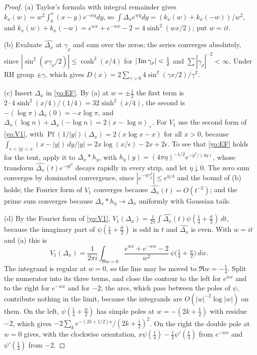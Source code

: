 \begin{proof}
(a) Taylor's formula with integral remainder gives $k_x(w)=w^2\int_0^x(x-y)e^{-wy}dy$, so $\int\Delta_xe^{wy}dy=(k_x(w)+k_x(-w))/w^2$, and $k_x(w)+k_x(-w)=e^{wx}+e^{-wx}-2=4\sinh^2(wx/2)$; put $w=it$.

(b) Evaluate $\widehat{\Delta_x}$ at $\gamma_\rho$ and sum over the zeros; the series converges absolutely, since $|\sin^2(x\gamma_\rho/2)|\le\cosh^2(x/4)$ for $|\operatorname{Im}\gamma_\rho|<\frac12$ and $\sum|\gamma_\rho|^{-2}<\infty$. Under RH group $\pm\gamma$, which gives $D(x)=2\sum_{\gamma>0}4\sin^2(\gamma x/2)/\gamma^2$.

(c) Insert $\Delta_x$ in \eqref{yo:EF}. By (a) at $w=\pm\frac12$ the first term is $2\cdot4\sinh^2(x/4)/(1/4)=32\sinh^2(x/4)$, the second is $-(\log\pi)\Delta_x(0)=-x\log\pi$, and $\Delta_x(\log n)+\Delta_x(-\log n)=2(x-\log n)_+$. For $V_1$ use the second form of \eqref{yo:V1}, with $\operatorname{Pf}(1/|y|)(\Delta_x)=2(x\log x-x)$ for all $x>0$, because $\int_{\epsilon<|y|<x}(x-|y|)\,dy/|y|=2x\log(x/\epsilon)-2x+2\epsilon$. To see that \eqref{yo:EF} holds for the tent, apply it to $\Delta_x*h_\eta$, with $h_\eta(y)=(4\pi\eta)^{-1/2}e^{-y^2/(4\eta)}$, whose transform $\widehat{\Delta_x}(t)e^{-\eta t^2}$ decays rapidly in every strip, and let $\eta\downarrow0$. The zero sum converges by dominated convergence, since $|e^{-\eta\gamma_\rho^2}|\le e^{\eta/4}$ and the bound of (b) holds; the Fourier form of $V_1$ converges because $\widehat{\Delta_x}(t)=O(t^{-2})$; and the prime sum converges because $\Delta_x*h_\eta\to\Delta_x$ uniformly with Gaussian tails.

(d) By the Fourier form of \eqref{yo:V1}, $V_1(\Delta_x)=\frac1{2\pi}\int\widehat{\Delta_x}(t)\psi(\frac14+\frac{it}2)\,dt$, because the imaginary part of $\psi(\frac14+\frac{it}2)$ is odd in $t$ and $\widehat{\Delta_x}$ is even. With $w=it$ and (a) this is
\[
V_1(\Delta_x)=\frac1{2\pi i}\int_{\Re w=0}\frac{e^{wx}+e^{-wx}-2}{w^2}\,\psi\bigl(\tfrac14+\tfrac w2\bigr)\,dw .
\]
The integrand is regular at $w=0$, so the line may be moved to $\Re w=-\frac14$. Split the numerator into its three terms, and close the contour to the left for $e^{wx}$ and to the right for $e^{-wx}$ and for $-2$; the arcs, which pass between the poles of $\psi$, contribute nothing in the limit, because the integrands are $O(|w|^{-2}\log|w|)$ on them. On the left, $\psi(\frac14+\frac w2)$ has simple poles at $w=-(2k+\frac12)$ with residue $-2$, which gives $-2\sum_ke^{-(2k+1/2)x}/(2k+\frac12)^2$. On the right the double pole at $w=0$ gives, with the clockwise orientation, $x\psi(\frac14)-\frac12\psi'(\frac14)$ from $e^{-wx}$ and $\psi'(\frac14)$ from $-2$.
\end{proof}

